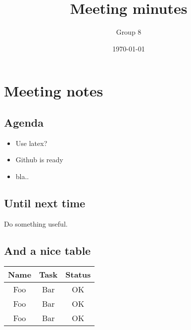 \documentclass[a4paper]{article}
\begin{document}
	\title{Meeting minutes}
	\author{Group 8}
	\date{\today}
	\maketitle

	\section{Meeting notes}
		\subsection{Agenda}
			\begin{itemize}
				\item Use latex?
				\item Github is ready
				\item bla..
			\end{itemize}
		
		\subsection{Until next time}
			Do something useful.

		\subsection{And a nice table}
			\begin{tabular}{|c|c|c|}
				\hline
				Name & Task & Status \\ 
				\hline \hline
				Foo & Bar & OK \\
				Foo & Bar & OK \\
				Foo & Bar & OK \\
				\hline
			\end{tabular}	
\end{document}
